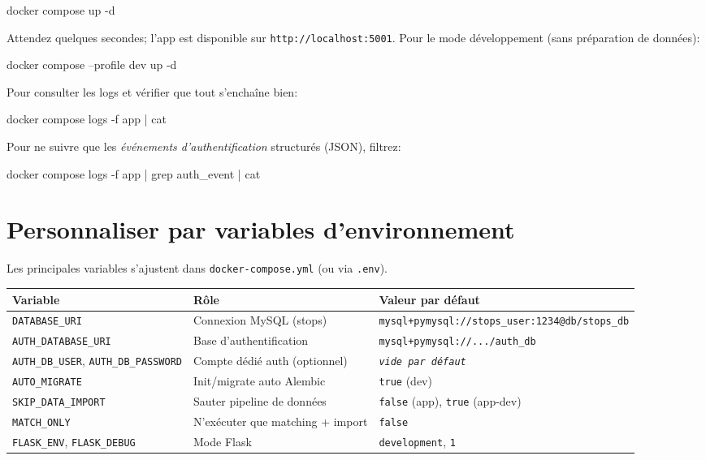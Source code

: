 \begin{cmdbox}
docker compose up -d
\end{cmdbox}

\noindent Attendez quelques secondes; l'app est disponible sur \texttt{http://localhost:5001}. Pour le mode développement (sans préparation de données):

\begin{cmdbox}
docker compose --profile dev up -d
\end{cmdbox}

\noindent Pour consulter les logs et vérifier que tout s'enchaîne bien:

\begin{cmdbox}
docker compose logs -f app | cat
\end{cmdbox}

\noindent Pour ne suivre que les \emph{événements d'authentification} structurés (JSON), filtrez:
\begin{cmdbox}
docker compose logs -f app | grep auth_event | cat
\end{cmdbox}

\section{Personnaliser par variables d'environnement}

Les principales variables s'ajustent dans \texttt{docker-compose.yml} (ou via \texttt{.env}).

\begin{center}
\begin{tabularx}{0.98\textwidth}{l l X}
\toprule
\textbf{Variable} & \textbf{Rôle} & \textbf{Valeur par défaut}\\
\midrule
\texttt{DATABASE\_URI} & Connexion MySQL (stops) & \texttt{mysql+pymysql://stops\_user:1234@db/stops\_db}\\
\texttt{AUTH\_DATABASE\_URI} & Base d'authentification & \texttt{mysql+pymysql://.../auth\_db}\\
\texttt{AUTH\_DB\_USER}, \texttt{AUTH\_DB\_PASSWORD} & Compte dédié auth (optionnel) & \texttt{\textit{vide par défaut}}\\
\texttt{AUTO\_MIGRATE} & Init/migrate auto Alembic & \texttt{true} (dev)\\
\texttt{SKIP\_DATA\_IMPORT} & Sauter pipeline de données & \texttt{false} (app), \texttt{true} (app-dev)\\
\texttt{MATCH\_ONLY} & N'exécuter que matching + import & \texttt{false}\\
\texttt{FLASK\_ENV}, \texttt{FLASK\_DEBUG} & Mode Flask & \texttt{development}, \texttt{1}\\
\bottomrule
\end{tabularx}
\end{center}


